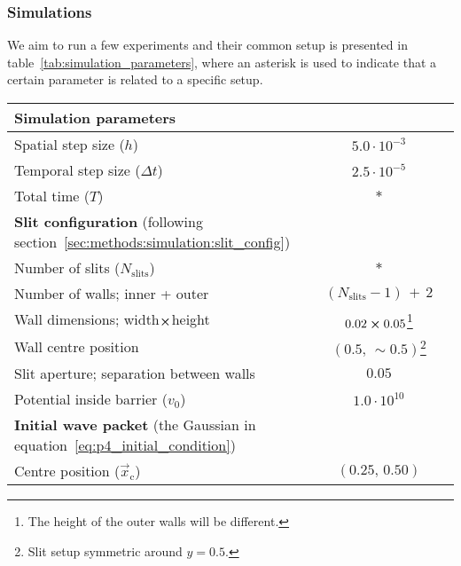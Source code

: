     \subsubsection{Simulations}\label{sec:methods:simulation:simulations}

        We aim to run a few experiments and their common setup is presented in table~\ref{tab:simulation_parameters}, where an asterisk is used to indicate that a certain parameter is related to a specific setup. 

        \begin{table}[ht!]
            \centering
            \begin{tabular}{l|c}
                \hline
                \multicolumn{2}{l}{\textbf{Simulation parameters}} \\
                \hline
                Spatial step size ($h$)         & $5.0 \cdot 10^{-3}$   \\
                Temporal step size ($\Delta t$) & $2.5 \cdot 10^{-5}$   \\
                Total time ($T$)                & $*$                   \\
                \hline
                \multicolumn{2}{l}{\textbf{Slit configuration} (following section~\ref{sec:methods:simulation:slit_config})} \\
                \hline
                Number of slits ($N_\mathrm{slits}$)    & $*$                           \\
                Number of walls; inner + outer          & $(N_\mathrm{slits}-1) \, + \, 2$\\
                Wall dimensions; width$\cross$height    & $0.02\cross 0.05$\footnote{The height of the outer walls will be different.} \\
                Wall centre position                    & $(0.5,\, \sim\!0.5)$\footnote{Slit setup symmetric around $y=0.5$.}   \\
                Slit aperture; separation between walls & $0.05$                        \\
                Potential inside barrier ($v_0$)        & $1.0\cdot 10^{10}$            \\
                \hline
                \multicolumn{2}{l}{\textbf{Initial wave packet} (the Gaussian in equation~\eqref{eq:p4_initial_condition})} \\
                \hline
                Centre position ($\vec{x}_\mathrm{c}$)  & $(0.25,\,0.50)$           \\

\end{tabular}
\end{table}
